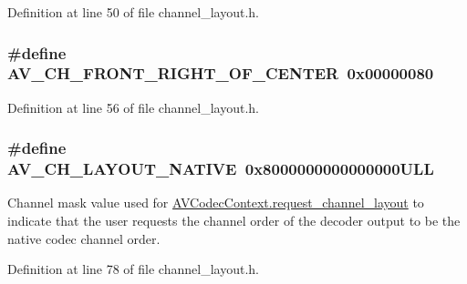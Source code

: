 Definition at line 50 of file channel\+\_\+layout.\+h.

\subsubsection[{\texorpdfstring{A\+V\+\_\+\+C\+H\+\_\+\+F\+R\+O\+N\+T\+\_\+\+R\+I\+G\+H\+T\+\_\+\+O\+F\+\_\+\+C\+E\+N\+T\+ER}{AV_CH_FRONT_RIGHT_OF_CENTER}}]{\setlength{\rightskip}{0pt plus 5cm}\#define A\+V\+\_\+\+C\+H\+\_\+\+F\+R\+O\+N\+T\+\_\+\+R\+I\+G\+H\+T\+\_\+\+O\+F\+\_\+\+C\+E\+N\+T\+ER~0x00000080}\hypertarget{group__channel__masks_ga558dc25b0ce327d2547d3cc9e4bd6a4e}{}\label{group__channel__masks_ga558dc25b0ce327d2547d3cc9e4bd6a4e}


Definition at line 56 of file channel\+\_\+layout.\+h.

\subsubsection[{\texorpdfstring{A\+V\+\_\+\+C\+H\+\_\+\+L\+A\+Y\+O\+U\+T\+\_\+\+N\+A\+T\+I\+VE}{AV_CH_LAYOUT_NATIVE}}]{\setlength{\rightskip}{0pt plus 5cm}\#define A\+V\+\_\+\+C\+H\+\_\+\+L\+A\+Y\+O\+U\+T\+\_\+\+N\+A\+T\+I\+VE~0x8000000000000000\+U\+LL}\hypertarget{group__channel__masks_ga7ab04ac641edef25c03de0a577eab57d}{}\label{group__channel__masks_ga7ab04ac641edef25c03de0a577eab57d}
Channel mask value used for \hyperlink{struct_a_v_codec_context_a9c02c458deaa58cc603da038b6acab1b}{A\+V\+Codec\+Context.\+request\+\_\+channel\+\_\+layout} to indicate that the user requests the channel order of the decoder output to be the native codec channel order. 

Definition at line 78 of file channel\+\_\+layout.\+h.

